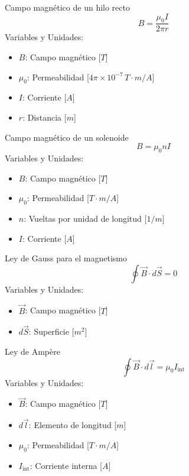 \documentclass{article}
\begin{document}
\begin{multicols}{3}

\begin{teorema}{Campo magnético de un hilo recto}
    $$B = \frac{\mu_0 I}{2\pi r}$$
    Variables y Unidades:
    \begin{itemize}
        \item $B$: Campo magnético [$T$]
        \item $\mu_0$: Permeabilidad [$4\pi \times 10^{-7} \, T\cdot m/A$]
        \item $I$: Corriente [$A$]
        \item $r$: Distancia [$m$]
    \end{itemize}
\end{teorema}

\begin{teorema}{Campo magnético de un solenoide}
    $$B = \mu_0 n I$$
    Variables y Unidades:
    \begin{itemize}
        \item $B$: Campo magnético [$T$]
        \item $\mu_0$: Permeabilidad [$T\cdot m/A$]
        \item $n$: Vueltas por unidad de longitud [$1/m$]
        \item $I$: Corriente [$A$]
    \end{itemize}
\end{teorema}

\begin{teorema}{Ley de Gauss para el magnetismo}
    $$\oint \vec{B} \cdot d\vec{S} = 0$$
    Variables y Unidades:
    \begin{itemize}
        \item $\vec{B}$: Campo magnético [$T$]
        \item $d\vec{S}$: Superficie [$m^2$]
    \end{itemize}
\end{teorema}

\columnbreak

\begin{teorema}{Ley de Ampère}
    $$\oint \vec{B} \cdot d\vec{l} = \mu_0 I_{\text{int}}$$
    Variables y Unidades:
    \begin{itemize}
        \item $\vec{B}$: Campo magnético [$T$]
        \item $d\vec{l}$: Elemento de longitud [$m$]
        \item $\mu_0$: Permeabilidad [$T\cdot m/A$]
        \item $I_{\text{int}}$: Corriente interna [$A$]
    \end{itemize}
\end{teorema}


\end{multicols}
\end{document}
